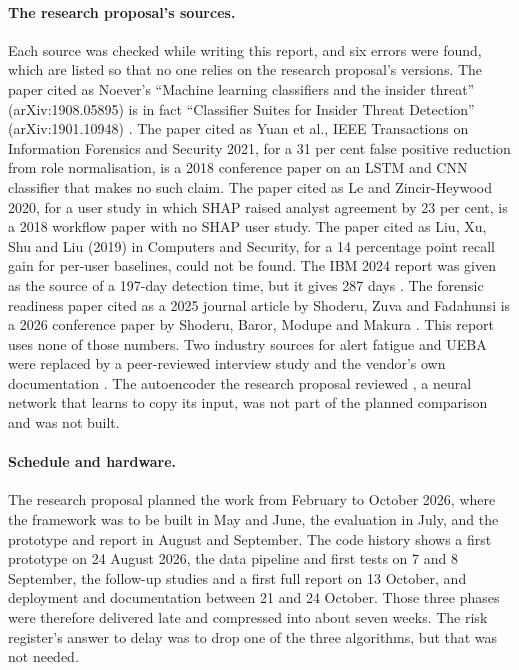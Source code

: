 \documentclass[a4paper,12pt]{article}
\begin{document}
\paragraph{The research proposal's sources.} Each source was checked while writing this report, and six errors were found, which are listed so that no one relies on the research proposal's versions. The paper cited as Noever's ``Machine learning classifiers and the insider threat'' (arXiv:1908.05895) is in fact ``Classifier Suites for Insider Threat Detection'' (arXiv:1901.10948) \cite{Noever2019}. The paper cited as Yuan et al., IEEE Transactions on Information Forensics and Security 2021, for a 31 per cent false positive reduction from role normalisation, is a 2018 conference paper on an LSTM and CNN classifier \cite{Yuan2018} that makes no such claim. The paper cited as Le and Zincir-Heywood 2020, for a user study in which SHAP raised analyst agreement by 23 per cent, is a 2018 workflow paper \cite{Le2018} with no SHAP user study. The paper cited as Liu, Xu, Shu and Liu (2019) in Computers and Security, for a 14 percentage point recall gain for per-user baselines, could not be found. The IBM 2024 report was given as the source of a 197-day detection time, but it gives 287 days \cite{IBM2024}. The forensic readiness paper cited as a 2025 journal article by Shoderu, Zuva and Fadahunsi is a 2026 conference paper by Shoderu, Baror, Modupe and Makura \cite{Shoderu2026}. This report uses none of those numbers. Two industry sources for alert fatigue and UEBA were replaced by a peer-reviewed interview study \cite{Alahmadi2022} and the vendor's own documentation \cite{MSSentinelUEBA}. The autoencoder the research proposal reviewed \cite{Hawkins2002}, a neural network that learns to copy its input, was not part of the planned comparison and was not built.

\paragraph{Schedule and hardware.} The research proposal planned the work from February to October 2026, where the framework was to be built in May and June, the evaluation in July, and the prototype and report in August and September. The code history shows a first prototype on 24 August 2026, the data pipeline and first tests on 7 and 8 September, the follow-up studies and a first full report on 13 October, and deployment and documentation between 21 and 24 October. Those three phases were therefore delivered late and compressed into about seven weeks. The risk register's answer to delay was to drop one of the three algorithms, but that was not needed.
\end{document}
